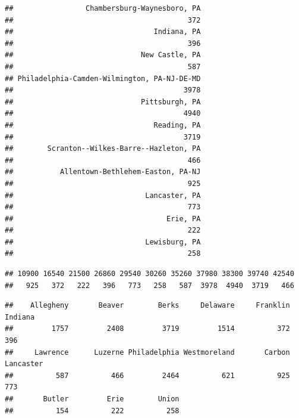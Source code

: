 \documentclass[
  12pt,
]{article}
\begin{document}
\begin{verbatim}
##                 Chambersburg-Waynesboro, PA 
##                                         372 
##                                 Indiana, PA 
##                                         396 
##                              New Castle, PA 
##                                         587 
## Philadelphia-Camden-Wilmington, PA-NJ-DE-MD 
##                                        3978 
##                              Pittsburgh, PA 
##                                        4940 
##                                 Reading, PA 
##                                        3719 
##        Scranton--Wilkes-Barre--Hazleton, PA 
##                                         466 
##           Allentown-Bethlehem-Easton, PA-NJ 
##                                         925 
##                               Lancaster, PA 
##                                         773 
##                                    Erie, PA 
##                                         222 
##                               Lewisburg, PA 
##                                         258
\end{verbatim}

\begin{verbatim}
## 10900 16540 21500 26860 29540 30260 35260 37980 38300 39740 42540 
##   925   372   222   396   773   258   587  3978  4940  3719   466
\end{verbatim}

\begin{verbatim}
##    Allegheny       Beaver        Berks     Delaware     Franklin      Indiana 
##         1757         2408         3719         1514          372          396 
##     Lawrence      Luzerne Philadelphia Westmoreland       Carbon    Lancaster 
##          587          466         2464          621          925          773 
##       Butler         Erie        Union 
##          154          222          258
\end{verbatim}
\end{document}
